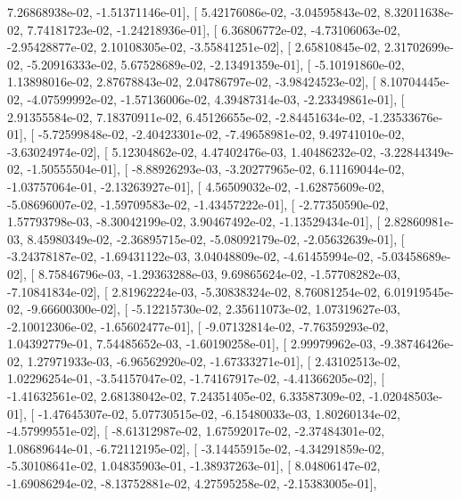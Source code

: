 \documentclass{article}
\begin{document}
          7.26868938e-02,  -1.51371146e-01],
       [  5.42176086e-02,  -3.04595843e-02,   8.32011638e-02,
          7.74181723e-02,  -1.24218936e-01],
       [  6.36806772e-02,  -4.73106063e-02,  -2.95428877e-02,
          2.10108305e-02,  -3.55841251e-02],
       [  2.65810845e-02,   2.31702699e-02,  -5.20916333e-02,
          5.67528689e-02,  -2.13491359e-01],
       [ -5.10191860e-02,   1.13898016e-02,   2.87678843e-02,
          2.04786797e-02,  -3.98424523e-02],
       [  8.10704445e-02,  -4.07599992e-02,  -1.57136006e-02,
          4.39487314e-03,  -2.23349861e-01],
       [  2.91355584e-02,   7.18370911e-02,   6.45126655e-02,
         -2.84451634e-02,  -1.23533676e-01],
       [ -5.72599848e-02,  -2.40423301e-02,  -7.49658981e-02,
          9.49741010e-02,  -3.63024974e-02],
       [  5.12304862e-02,   4.47402476e-03,   1.40486232e-02,
         -3.22844349e-02,  -1.50555504e-01],
       [ -8.88926293e-03,  -3.20277965e-02,   6.11169044e-02,
         -1.03757064e-01,  -2.13263927e-01],
       [  4.56509032e-02,  -1.62875609e-02,  -5.08696007e-02,
         -1.59709583e-02,  -1.43457222e-01],
       [ -2.77350590e-02,   1.57793798e-03,  -8.30042199e-02,
          3.90467492e-02,  -1.13529434e-01],
       [  2.82860981e-03,   8.45980349e-02,  -2.36895715e-02,
         -5.08092179e-02,  -2.05632639e-01],
       [ -3.24378187e-02,  -1.69431122e-03,   3.04048809e-02,
         -4.61455994e-02,  -5.03458689e-02],
       [  8.75846796e-03,  -1.29363288e-03,   9.69865624e-02,
         -1.57708282e-03,  -7.10841834e-02],
       [  2.81962224e-03,  -5.30838324e-02,   8.76081254e-02,
          6.01919545e-02,  -9.66600300e-02],
       [ -5.12215730e-02,   2.35611073e-02,   1.07319627e-03,
         -2.10012306e-02,  -1.65602477e-01],
       [ -9.07132814e-02,  -7.76359293e-02,   1.04392779e-01,
          7.54485652e-03,  -1.60190258e-01],
       [  2.99979962e-03,  -9.38746426e-02,   1.27971933e-03,
         -6.96562920e-02,  -1.67333271e-01],
       [  2.43102513e-02,   1.02296254e-01,  -3.54157047e-02,
         -1.74167917e-02,  -4.41366205e-02],
       [ -1.41632561e-02,   2.68138042e-02,   7.24351405e-02,
          6.33587309e-02,  -1.02048503e-01],
       [ -1.47645307e-02,   5.07730515e-02,  -6.15480033e-03,
          1.80260134e-02,  -4.57999551e-02],
       [ -8.61312987e-02,   1.67592017e-02,  -2.37484301e-02,
          1.08689644e-01,  -6.72112195e-02],
       [ -3.14455915e-02,  -4.34291859e-02,  -5.30108641e-02,
          1.04835903e-01,  -1.38937263e-01],
       [  8.04806147e-02,  -1.69086294e-02,  -8.13752881e-02,
          4.27595258e-02,  -2.15383005e-01],
\end{document}
